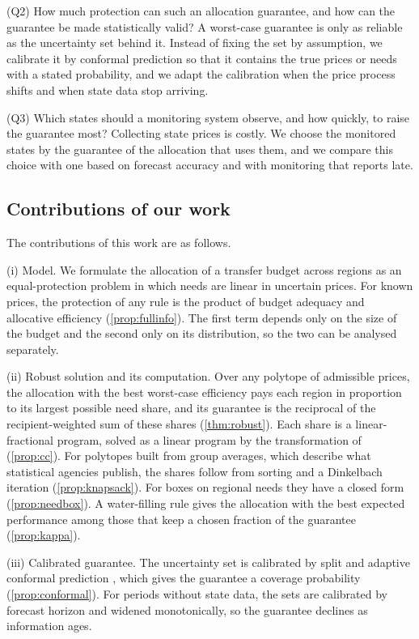 \documentclass[preprint,12pt,number]{elsarticle}%
\theoremstyle{definition}
\theoremstyle{remark}
\begin{document}
(Q2) How much protection can such an allocation guarantee, and how can the guarantee be made statistically valid? A worst-case guarantee is only as reliable as the uncertainty set behind it. Instead of fixing the set by assumption, we calibrate it by conformal prediction so that it contains the true prices or needs with a stated probability, and we adapt the calibration when the price process shifts and when state data stop arriving.

(Q3) Which states should a monitoring system observe, and how quickly, to raise the guarantee most? Collecting state prices is costly. We choose the monitored states by the guarantee of the allocation that uses them, and we compare this choice with one based on forecast accuracy and with monitoring that reports late.

\subsection{Contributions of our work}\label{sec:contrib}

The contributions of this work are as follows.

(i) Model. We formulate the allocation of a transfer budget across regions as an equal-protection problem in which needs are linear in uncertain prices. For known prices, the protection of any rule is the product of budget adequacy and allocative efficiency (\cref{prop:fullinfo}). The first term depends only on the size of the budget and the second only on its distribution, so the two can be analysed separately.

(ii) Robust solution and its computation. Over any polytope of admissible prices, the allocation with the best worst-case efficiency pays each region in proportion to its largest possible need share, and its guarantee is the reciprocal of the recipient-weighted sum of these shares (\cref{thm:robust}). Each share is a linear-fractional program, solved as a linear program by the transformation of \citet{charnes1962programming} (\cref{prop:cc}). For polytopes built from group averages, which describe what statistical agencies publish, the shares follow from sorting and a Dinkelbach iteration (\cref{prop:knapsack}). For boxes on regional needs they have a closed form (\cref{prop:needbox}). A water-filling rule gives the allocation with the best expected performance among those that keep a chosen fraction of the guarantee (\cref{prop:kappa}).

(iii) Calibrated guarantee. The uncertainty set is calibrated by split and adaptive conformal prediction \citep{vovk2005algorithmic,gibbs2021aci}, which gives the guarantee a coverage probability (\cref{prop:conformal}). For periods without state data, the sets are calibrated by forecast horizon and widened monotonically, so the guarantee declines as information ages.
\end{document}
